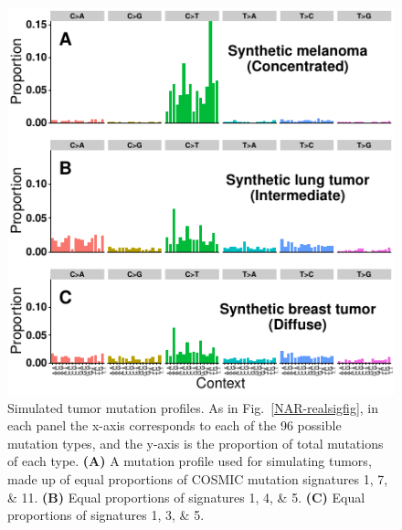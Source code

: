\documentclass[a4,center,fleqn]{NAR}
\begin{document}
\begin{figure}
\centering
  \includegraphics{figures/sim_signatures_only.pdf}
  \caption{Simulated tumor mutation profiles.
As in Fig.~\ref{NAR-realsigfig}, in each panel the x-axis corresponds to each of the 96 possible mutation types, and the y-axis is the proportion of total mutations of each type.
  \textbf{(A)} A mutation profile used for simulating tumors, made up of equal proportions of COSMIC mutation signatures 1, 7, \& 11.
  \textbf{(B)} Equal proportions of signatures 1, 4, \& 5.
  \textbf{(C)} Equal proportions of signatures 1, 3, \& 5.
   }
  \label{NAR-simsigfig}
 \end{figure}
\end{document}
